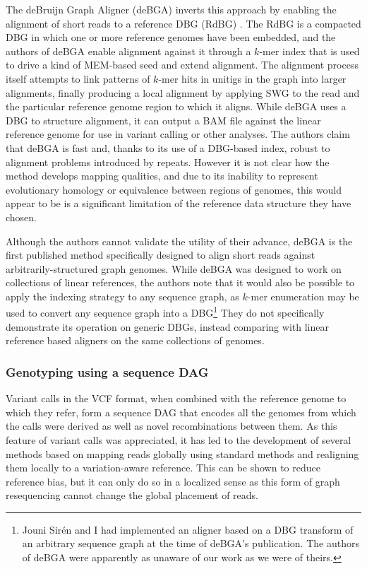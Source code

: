 The deBruijn Graph Aligner (deBGA) inverts this approach by enabling the alignment of short reads to a reference DBG (RdBG) \cite{liu2016debga}.
The RdBG is a compacted DBG in which one or more reference genomes have been embedded, and the authors of deBGA enable alignment against it through a $k$-mer index that is used to drive a kind of MEM-based seed and extend alignment.
The alignment process itself attempts to link patterns of $k$-mer hits in unitigs in the graph into larger alignments, finally producing a local alignment by applying SWG to the read and the particular reference genome region to which it aligns.
While deBGA uses a DBG to structure alignment, it can output a BAM file against the linear reference genome for use in variant calling or other analyses.
The authors claim that deBGA is fast and, thanks to its use of a DBG-based index, robust to alignment problems introduced by repeats.
However it is not clear how the method develops mapping qualities, and due to its inability to represent evolutionary homology or equivalence between regions of genomes, this would appear to be is a significant limitation of the reference data structure they have chosen.

Although the authors cannot validate the utility of their advance, deBGA is the first published method specifically designed to align short reads against arbitrarily-structured graph genomes.
While deBGA was designed to work on collections of linear references, the authors note that it would also be possible to apply the indexing strategy to any sequence graph, as $k$-mer enumeration may be used to convert any sequence graph into a DBG\footnote{Jouni Sir\'{e}n and I had implemented an aligner based on a DBG transform of an arbitrary sequence graph at the time of deBGA's publication. The authors of deBGA were apparently as unaware of our work as we were of theirs.}
They do not specifically demonstrate its operation on generic DBGs, instead comparing with linear reference based aligners on the same collections of genomes.

\subsubsection{Genotyping using a sequence DAG}
\label{sec:seq_dag_vcf}
Variant calls in the VCF format, when combined with the reference genome to which they refer, form a sequence DAG that encodes all the genomes from which the calls were derived as well as novel recombinations between them.
As this feature of variant calls was appreciated, it has led to the development of several methods based on mapping reads globally using standard methods and realigning them locally to a variation-aware reference.
This can be shown to reduce reference bias, but it can only do so in a localized sense as this form of graph resequencing cannot change the global placement of reads.

